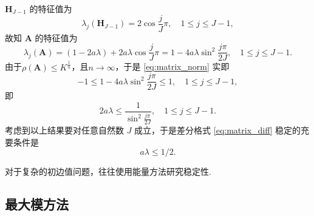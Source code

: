 $\bm{H}_{J-1}$ 的特征值为
\begin{equation*}
    \lambda_j(\bm{H}_{J-1}) = 2\cos \frac{j}{J}\pi, \quad 1 \leq j \leq J-1,
\end{equation*}
故知 $\bm{A}$ 的特征值为
\begin{equation*}
    \lambda_j(\bm{A}) = (1 - 2a\lambda) + 2a\lambda \cos \frac{j}{J}\pi = 1 - 4a\lambda \sin^2 \frac{j\pi}{2J}, \quad 1 \leq j \leq J-1.
\end{equation*}
由于$\rho(\bm{A})\leq K^{\frac{1}{n}}$，且$n\to\infty$，于是 \eqref{eq:matrix_norm} 实即
\begin{equation*}
    -1 \leq 1 - 4a\lambda \sin^2 \frac{j\pi}{2J} \leq 1, \quad 1 \leq j \leq J-1,
\end{equation*}
即
\begin{equation*}
    2a\lambda \leq \frac{1}{\sin^2 \frac{j\pi}{2J}}, \quad 1 \leq j \leq J-1.
\end{equation*}
考虑到以上结果要对任意自然数 $J$ 成立，于是差分格式 \eqref{eq:matrix_diff} 稳定的充要条件是
\begin{equation*}
    a\lambda \leq 1/2.
\end{equation*}

\begin{note}
    对于复杂的初边值问题，往往使用能量方法研究稳定性.
\end{note}

\subsection{最大模方法}

